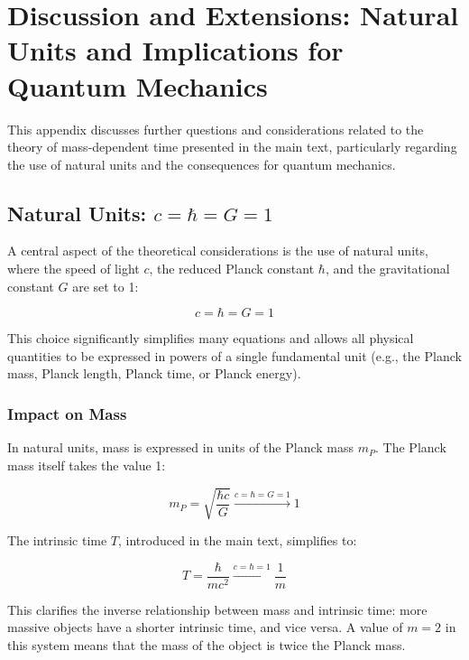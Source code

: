 \documentclass{article}
\begin{document}
	\section{Discussion and Extensions: Natural Units and Implications for Quantum Mechanics}
	
	This appendix discusses further questions and considerations related to the theory of mass-dependent time presented in the main text, particularly regarding the use of natural units and the consequences for quantum mechanics.
	
	\subsection{Natural Units: $c = \hbar = G = 1$}
	
	A central aspect of the theoretical considerations is the use of natural units, where the speed of light $c$, the reduced Planck constant $\hbar$, and the gravitational constant $G$ are set to 1:
	
	\begin{equation}
		c = \hbar = G = 1
	\end{equation}
	
	This choice significantly simplifies many equations and allows all physical quantities to be expressed in powers of a single fundamental unit (e.g., the Planck mass, Planck length, Planck time, or Planck energy).
	
	\subsubsection{Impact on Mass}
	
	In natural units, mass is expressed in units of the Planck mass $m_P$. The Planck mass itself takes the value 1:
	
	\begin{equation}
		m_P = \sqrt{\frac{\hbar c}{G}} \xrightarrow{c=\hbar=G=1} 1
	\end{equation}
	
	The intrinsic time $T$, introduced in the main text, simplifies to:
	
	\begin{equation}
		T = \frac{\hbar}{mc^2} \xrightarrow{c=\hbar=1} \frac{1}{m}
	\end{equation}
	
	This clarifies the inverse relationship between mass and intrinsic time: more massive objects have a shorter intrinsic time, and vice versa. A value of $m = 2$ in this system means that the mass of the object is twice the Planck mass.
	
\end{document}
